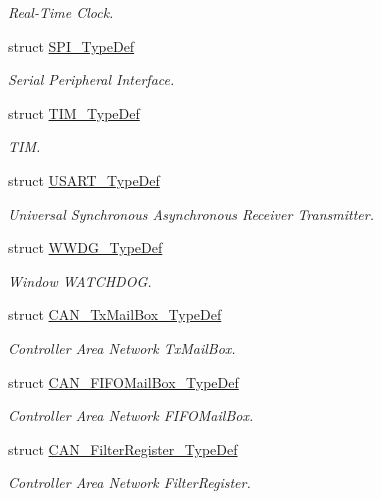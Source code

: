 \begin{DoxyCompactItemize}
\begin{DoxyCompactList}\small\item\em Real-\/\+Time Clock. \end{DoxyCompactList}\item 
struct \hyperlink{struct_s_p_i___type_def}{S\+P\+I\+\_\+\+Type\+Def}
\begin{DoxyCompactList}\small\item\em Serial Peripheral Interface. \end{DoxyCompactList}\item 
struct \hyperlink{struct_t_i_m___type_def}{T\+I\+M\+\_\+\+Type\+Def}
\begin{DoxyCompactList}\small\item\em T\+IM. \end{DoxyCompactList}\item 
struct \hyperlink{struct_u_s_a_r_t___type_def}{U\+S\+A\+R\+T\+\_\+\+Type\+Def}
\begin{DoxyCompactList}\small\item\em Universal Synchronous Asynchronous Receiver Transmitter. \end{DoxyCompactList}\item 
struct \hyperlink{struct_w_w_d_g___type_def}{W\+W\+D\+G\+\_\+\+Type\+Def}
\begin{DoxyCompactList}\small\item\em Window W\+A\+T\+C\+H\+D\+OG. \end{DoxyCompactList}\item 
struct \hyperlink{struct_c_a_n___tx_mail_box___type_def}{C\+A\+N\+\_\+\+Tx\+Mail\+Box\+\_\+\+Type\+Def}
\begin{DoxyCompactList}\small\item\em Controller Area Network Tx\+Mail\+Box. \end{DoxyCompactList}\item 
struct \hyperlink{struct_c_a_n___f_i_f_o_mail_box___type_def}{C\+A\+N\+\_\+\+F\+I\+F\+O\+Mail\+Box\+\_\+\+Type\+Def}
\begin{DoxyCompactList}\small\item\em Controller Area Network F\+I\+F\+O\+Mail\+Box. \end{DoxyCompactList}\item 
struct \hyperlink{struct_c_a_n___filter_register___type_def}{C\+A\+N\+\_\+\+Filter\+Register\+\_\+\+Type\+Def}
\begin{DoxyCompactList}\small\item\em Controller Area Network Filter\+Register. \end{DoxyCompactList}\item 

\end{DoxyCompactItemize}
